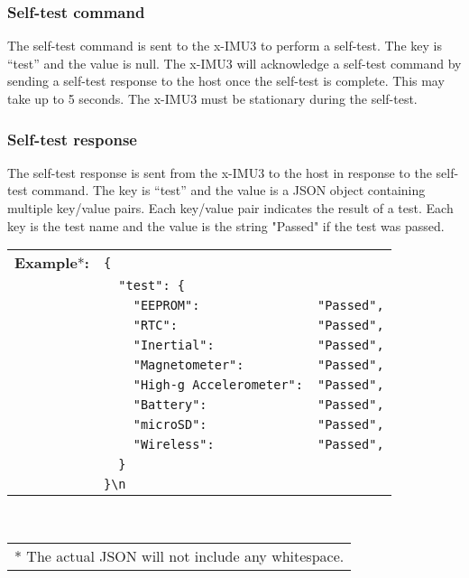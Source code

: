 
\subsubsection{Self-test command}

The self-test command is sent to the x-IMU3 to perform a self-test.  The key is \enquote{test} and the value is null.  The x-IMU3 will acknowledge a self-test command by sending a self-test response to the host once the self-test is complete.  This may take up to 5 seconds.  The x-IMU3 must be stationary during the self-test.


\subsubsection{Self-test response}

The self-test response is sent from the x-IMU3 to the host in response to the self-test command.  The key is \enquote{test} and the value is a \ac{JSON} object containing multiple key/value pairs.  Each key/value pair indicates the result of a test.  Each key is the test name and the value is the string "Passed" if the test was passed.

\begin{table}[H]
    \begin{tabular}{l l l}
        \textbf{Example}*\textbf{:} & \texttt{\{}\\
        & \texttt{~~"test":~\{} &\\
        & \texttt{~~~~"EEPROM":} & \texttt{"Passed",}\\
        & \texttt{~~~~"RTC":} & \texttt{"Passed",}\\
        & \texttt{~~~~"Inertial":} & \texttt{"Passed",}\\
        & \texttt{~~~~"Magnetometer":} & \texttt{"Passed",}\\
        & \texttt{~~~~"High-g Accelerometer":} & \texttt{"Passed",}\\
        & \texttt{~~~~"Battery":} & \texttt{"Passed",}\\
        & \texttt{~~~~"microSD":} & \texttt{"Passed",}\\
        & \texttt{~~~~"Wireless":} & \texttt{"Passed",}\\
        & \texttt{~~\}}\\
        & \texttt{\}\textbackslash n}\\
    \end{tabular}\\
    \begin{tabular}{l}
        \\
        \footnotesize{* The actual \acs{JSON} will not include any whitespace.}
    \end{tabular}
\end{table}

